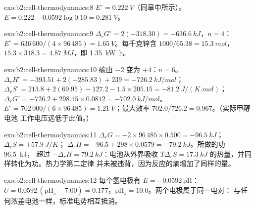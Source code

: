 \begin{solution}{exo:b2:cell-thermodynamics:8}
$E^\circ = \qty{0.222}{V}$（同章中所示）。$E = 0.222 - 0.0592\log 0.10 =
\qty{0.281}{V}$。
\end{solution}

\begin{solution}{exo:b2:cell-thermodynamics:9}
$\Delta_r G^\circ = 2(-318.30) = \qty{-636.6}{kJ}$，$n = 4$：$E^\circ =
636\,600/(4 \times 96\,485) = \qty{1.65}{V}$。每千克锌含 $1000/65.38 =
\qty{15.3}{mol}$，$15.3 \times 318.3 = \qty{4.87}{MJ}$，即 \qty{1.35}{kW.h}。
\end{solution}

\begin{solution}{exo:b2:cell-thermodynamics:10}
碳由 $-2$ 变为 $+4$：$n = 6$。$\Delta_r H^\circ = -393.51 + 2(-285.83) +
239 = \qty{-726.2}{kJ/mol}$；$\Delta_r S^\circ = 213.8 + 2(69.95) - 127.2 - 1.5
\times 205.15 = \qty{-81.2}{J/(K.mol)}$；$\Delta_r G^\circ = -726.2 + 298.15 \times
0.0812 = \qty{-702.0}{kJ/mol}$。$E^\circ = 702\,000/(6 \times 96\,485) =
\qty{1.21}{V}$；最大效率 $702.0/726.2 = 0.967$。（实际甲醇电池
工作电压远低于此值。）
\end{solution}

\begin{solution}{exo:b2:cell-thermodynamics:11}
$\Delta_r G = -2 \times 96\,485 \times 0.500 = \qty{-96.5}{kJ}$；$\Delta_r S = +\qty{57.9}{J/K}$；
$\Delta_r H = -96.5 + 298 \times 0.0579 = \qty{-79.2}{kJ}$。所做的功 \qty{96.5}{kJ}，
超过 $-\Delta_r H = \qty{79.2}{kJ}$：电池从外界吸收 $T\Delta_r S = \qty{17.3}{kJ}$
的热量，并同样转化为功。热力学第二定律
并未被违背，因为反应的熵增加了同样的量。
\end{solution}

\begin{solution}{exo:b2:cell-thermodynamics:12}
每个氢电极有 $E = -0.0592\,\mathrm{pH}$：$U = 0.0592\,(\mathrm{pH}_s -
7.00) = 0.177$，$\mathrm{pH}_s = 10.0$。两个电极属于同一电对：
与任何浓差电池一样，标准电势相互抵消。
\end{solution}

